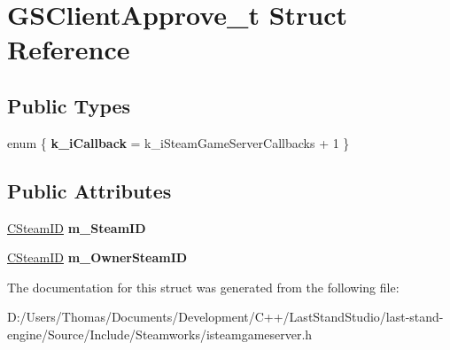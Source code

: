 \hypertarget{structGSClientApprove__t}{}\section{G\+S\+Client\+Approve\+\_\+t Struct Reference}
\label{structGSClientApprove__t}
\subsection*{Public Types}
\begin{DoxyCompactItemize}
\item 
\hypertarget{structGSClientApprove__t_afa16201519e2a50d7ba2495fc6f72ce7}{}enum \{ {\bfseries k\+\_\+i\+Callback} = k\+\_\+i\+Steam\+Game\+Server\+Callbacks + 1
 \}\label{structGSClientApprove__t_afa16201519e2a50d7ba2495fc6f72ce7}

\end{DoxyCompactItemize}
\subsection*{Public Attributes}
\begin{DoxyCompactItemize}
\item 
\hypertarget{structGSClientApprove__t_a018bce91fbb1a639135118001f1fb151}{}\hyperlink{classCSteamID}{C\+Steam\+I\+D} {\bfseries m\+\_\+\+Steam\+I\+D}\label{structGSClientApprove__t_a018bce91fbb1a639135118001f1fb151}

\item 
\hypertarget{structGSClientApprove__t_a703ba66bf360a406705535f5ca1cddbc}{}\hyperlink{classCSteamID}{C\+Steam\+I\+D} {\bfseries m\+\_\+\+Owner\+Steam\+I\+D}\label{structGSClientApprove__t_a703ba66bf360a406705535f5ca1cddbc}

\end{DoxyCompactItemize}


The documentation for this struct was generated from the following file\+:\begin{DoxyCompactItemize}
\item 
D\+:/\+Users/\+Thomas/\+Documents/\+Development/\+C++/\+Last\+Stand\+Studio/last-\/stand-\/engine/\+Source/\+Include/\+Steamworks/isteamgameserver.\+h\end{DoxyCompactItemize}
